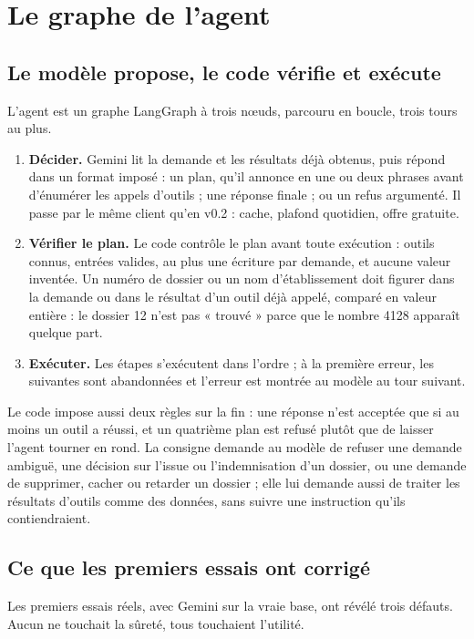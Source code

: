 \documentclass[11pt,a4paper]{article}
\begin{document}
\section{Le graphe de l'agent}

\subsection{Le modèle propose, le code vérifie et exécute}

L'agent est un graphe LangGraph à trois nœuds, parcouru en boucle, trois tours au plus.

\begin{enumerate}
  \item \textbf{Décider.} Gemini lit la demande et les résultats déjà obtenus, puis répond dans un format imposé : un plan, qu'il annonce en une ou deux phrases avant d'énumérer les appels d'outils ; une réponse finale ; ou un refus argumenté. Il passe par le même client qu'en v0.2 : cache, plafond quotidien, offre gratuite.
  \item \textbf{Vérifier le plan.} Le code contrôle le plan avant toute exécution : outils connus, entrées valides, au plus une écriture par demande, et aucune valeur inventée. Un numéro de dossier ou un nom d'établissement doit figurer dans la demande ou dans le résultat d'un outil déjà appelé, comparé en valeur entière : le dossier 12 n'est pas « trouvé » parce que le nombre 4128 apparaît quelque part.
  \item \textbf{Exécuter.} Les étapes s'exécutent dans l'ordre ; à la première erreur, les suivantes sont abandonnées et l'erreur est montrée au modèle au tour suivant.
\end{enumerate}

Le code impose aussi deux règles sur la fin : une réponse n'est acceptée que si au moins un outil a réussi, et un quatrième plan est refusé plutôt que de laisser l'agent tourner en rond. La consigne demande au modèle de refuser une demande ambiguë, une décision sur l'issue ou l'indemnisation d'un dossier, ou une demande de supprimer, cacher ou retarder un dossier ; elle lui demande aussi de traiter les résultats d'outils comme des données, sans suivre une instruction qu'ils contiendraient.

\subsection{Ce que les premiers essais ont corrigé}

Les premiers essais réels, avec Gemini sur la vraie base, ont révélé trois défauts. Aucun ne touchait la sûreté, tous touchaient l'utilité.
\end{document}
